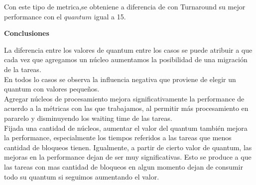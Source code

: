    \indent Con este tipo de metrica,se obteniene a diferencia de con Turnaround  su mejor
   performance con el $quantum$ igual a 15.\\
  
 \begin{center}
  \textbf{Conclusiones}
 \end{center}


\indent \indent La diferencia entre los valores de quantum entre los casos se puede atribuir a que cada vez que 
agregamos un núcleo aumentamos la posibilidad de una migración de la tareas.\\
\indent \indent En todos lo casos se observa la influencia negativa que proviene de elegir un quantum con valores pequeños.\\
\indent \indent Agregar núcleos de procesamiento mejora significativamente la performance de acuerdo a la métricas con las que
trabajamos, al permitir más procesamiento en pararelo y disminuyendo los waiting time de las tareas.\\
\indent \indent  Fijada una cantidad de núcleos, aumentar el valor del quantum también mejora la performance, 
especialmente los tiempos referidos a las tareas que menos cantidad de bloqueos tienen. 
Igualmente, a partir de cierto valor de quantum, las mejoras en la performance dejan de ser muy significativas. 
Esto se produce a que las tareas con mas cantidad de bloqueos en algun momento dejan de consumir todo
su quantum si seguimos aumentando el valor. 
 
 
 
